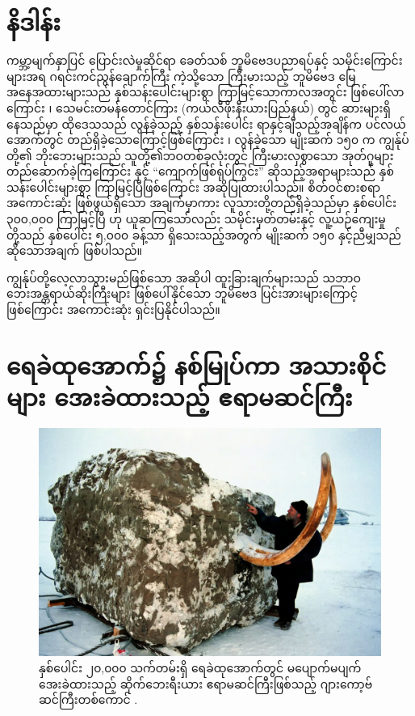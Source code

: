 \documentclass[10pt,twocolumn,letterpaper]{article}
\begin{document}

\section{နိဒါန်း}

ကမ္ဘာ့မျက်နှာပြင် ပြောင်းလဲမှုဆိုင်ရာ ခေတ်သစ် ဘူမိဗေဒပညာရပ်နှင့် သမိုင်းကြောင်းများအရ ဂရင်းကင်ညွန်ချောက်ကြီး ကဲ့သို့သော ကြီးမားသည့် ဘူမိဗေဒ မြေအနေအထားများသည် နှစ်သန်းပေါင်းများစွာ ကြာမြင့်သောကာလအတွင်း ဖြစ်ပေါ်လာကြောင်း \cite{143}၊ သေမင်းတမန်တောင်ကြား (ကယ်လီဖိုးနီးယားပြည်နယ်) တွင် ဆားများရှိနေသည်မှာ ထိုဒေသသည် လွန်ခဲ့သည့် နှစ်သန်းပေါင်း ရာနှင့်ချီသည့်အချိန်က ပင်လယ်အောက်တွင် တည်ရှိခဲ့သောကြောင့်ဖြစ်ကြောင်း \cite{144}၊ လွန်ခဲ့သော မျိုးဆက် ၁၅၀ က ကျွန်ုပ်တို့၏ ဘိုးဘေးများသည် သူတို့၏ဘဝတစ်ခုလုံးတွင် ကြီးမားလှစွာသော အုတ်ဂူများ တည်ဆောက်ခဲ့ကြကြောင်း \cite{29,70}နှင့် “ကျောက်ဖြစ်ရုပ်ကြွင်း” ဆိုသည့်အရာများသည် နှစ်သန်းပေါင်းများစွာ ကြာမြင့်ပြီဖြစ်ကြောင်း \cite{104} အဆိုပြုထားပါသည်။ စိတ်ဝင်စားစရာ အကောင်းဆုံး ဖြစ်ဖွယ်ရှိသော အချက်မှာကား လူသားတို့တည်ရှိခဲ့သည်မှာ နှစ်ပေါင်း ၃၀၀,၀၀၀ ကြာမြင့်ပြီ \cite{145}ဟု ယူဆကြသော်လည်း သမိုင်းမှတ်တမ်းနှင့် လူ့ယဉ်ကျေးမှုတို့သည် နှစ်ပေါင်း ၅,၀၀၀ ခန့်သာ ရှိသေးသည့်အတွက် မျိုးဆက် ၁၅၀ နှင့်ညီမျှသည်ဆိုသောအချက် ဖြစ်ပါသည်။

ကျွန်ုပ်တို့လေ့လာသွားမည်ဖြစ်သော အဆိုပါ ထူးခြားချက်များသည် သဘာဝဘေးအန္တရာယ်ဆိုးကြီးများ ဖြစ်ပေါ်နိုင်သော ဘူမိဗေဒ ပြင်းအားများကြောင့် ဖြစ်ကြောင်း အကောင်းဆုံး ရှင်းပြနိုင်ပါသည်။

\section{ရေခဲထုအောက်၌ နစ်မြုပ်ကာ အသားစိုင်များ အေးခဲထားသည့် ဧရာမဆင်ကြီး}

\begin{figure}[t]
\begin{center}
   \includegraphics[width=1\linewidth]{jarkov-mammoth.jpg}
\end{center}
   \caption{နှစ်ပေါင်း ၂၀,၀၀၀ သက်တမ်းရှိ ရေခဲထုအောက်တွင် မပျောက်မပျက် အေးခဲထားသည့် ဆိုက်ဘေးရီးယား ဧရာမဆင်ကြီးဖြစ်သည့် ဂျားကော့ဗ်ဆင်ကြီးတစ်ကောင် \cite{51}.}
\label{fig:1}
\label{fig:onecol}
\end{figure}
\end{document}
